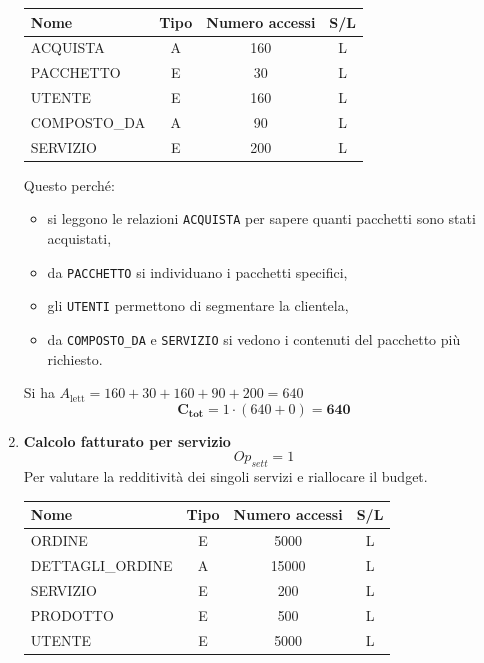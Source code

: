 \documentclass[a4paper,12pt]{report}
\begin{document}
\begin{enumerate}
    \begin{table}[H]
    \centering
    \small
    \renewcommand{\arraystretch}{1.15}
    \begin{tabularx}{0.8\textwidth}{|X|c|c|c|}
        \hline
        \rowcolor{gray!20}
        \textbf{Nome} & \textbf{Tipo} & \textbf{Numero accessi} & \textbf{S/L} \\
        \hline
        ACQUISTA & A & 160 & L \\
        PACCHETTO & E & 30 & L \\
        UTENTE & E & 160 & L \\
        COMPOSTO\_DA & A & 90 & L \\
        SERVIZIO & E & 200 & L \\
        \hline
    \end{tabularx}
    \end{table}

    Questo perché:  
    \begin{itemize}
        \item si leggono le relazioni \texttt{ACQUISTA} per sapere quanti pacchetti sono stati acquistati,  
        \item da \texttt{PACCHETTO} si individuano i pacchetti specifici,  
        \item gli \texttt{UTENTI} permettono di segmentare la clientela,  
        \item da \texttt{COMPOSTO\_DA} e \texttt{SERVIZIO} si vedono i contenuti del pacchetto più richiesto.  
    \end{itemize}

    Si ha $A_{\text{lett}} = 160 + 30 + 160 + 90 + 200 = 640$  
    $$\mathbf{C_{tot}} = 1 \cdot (640 + 0) = \mathbf{640}$$


      \item {\large \textbf{Calcolo fatturato per servizio}} \label{op22}
      $$
      {Op}_{sett} = 1
      $$
      Per valutare la redditività dei singoli servizi e riallocare il budget.

      \begin{table}[H]
      \centering
      \small
      \renewcommand{\arraystretch}{1.15}
      \begin{tabularx}{0.8\textwidth}{|X|c|c|c|}
          \hline
          \rowcolor{gray!20}
          \textbf{Nome} & \textbf{Tipo} & \textbf{Numero accessi} & \textbf{S/L} \\
          \hline
          ORDINE & E & 5000 & L \\
          DETTAGLI\_ORDINE & A & 15000 & L \\
          SERVIZIO & E & 200 & L \\
          PRODOTTO & E & 500 & L \\
          UTENTE & E & 5000 & L \\
          \hline
      \end{tabularx}
      \end{table}


\end{enumerate}
\end{document}
